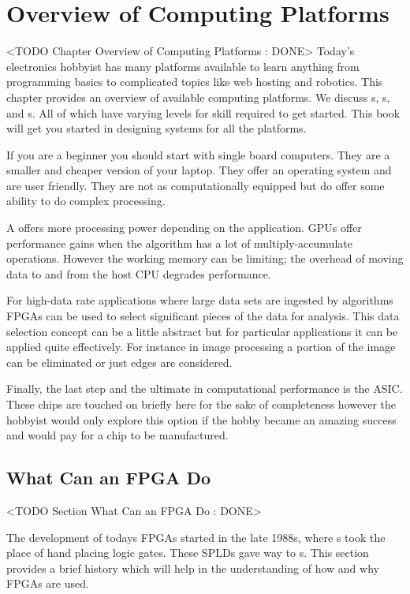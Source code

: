 \chapter{Overview of Computing Platforms}
	<TODO Chapter Overview of Computing Platforms : DONE>
Today's electronics hobbyist has many platforms available to learn anything from programming basics to complicated topics like web hosting and robotics. This chapter provides an overview  of available computing platforms. We discuss s, s, and s. All of which have varying levels for skill required to get started. This book will get you started in designing systems for all the platforms.  

If you are a beginner you should start with single board computers. They are a smaller and cheaper version of your laptop. They offer an operating system and are user friendly. They are not as computationally equipped but do offer some ability to do complex processing. 

A  offers more processing power depending on the application. \ac{GPU}s offer performance gains when the algorithm has a lot of multiply-accumulate operations. However the working memory can be limiting; the overhead of moving data to and from the host \ac{CPU} degrades performance.

For high-data rate applications where large data sets are ingested by algorithms \ac{FPGA}s can be used to select significant pieces of the data for analysis. This data selection concept can be a little abstract but for particular applications it can be applied quite effectively. For instance in image processing a portion of the image can be eliminated or just edges are considered. 

Finally, the last step and the ultimate in computational performance is the \ac{ASIC}. These chips are touched on briefly here for the sake of completeness however the hobbyist would only explore this option if the hobby became an amazing success and would pay for a chip to be manufactured. 
	
	
\section{What Can an FPGA Do}
	<TODO Section What Can an FPGA Do : DONE>

The development of todays \ac{FPGA}s started in the late 1988s, where s took the place of hand placing logic gates. These \ac{SPLD}s gave way to s. This section provides a brief history which will help in the understanding of how and why \ac{FPGA}s are used.  	

